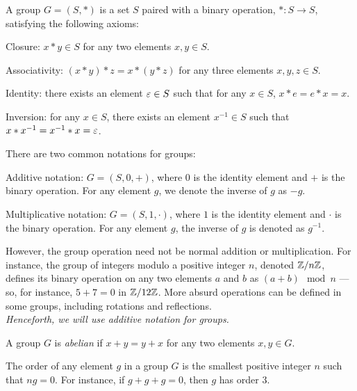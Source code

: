 \begin{definition}
  A group $G = (S, \ast)$ is a set $S$ paired with a binary operation,
  $\ast : S \to S$, satisfying the following axioms:
  \begin{enumroman}
    \item Closure: $x \ast y \in S$ for any two elements $x, y \in S$.
    \item Associativity: $(x \ast y) \ast z = x \ast (y \ast z)$
      for any three elements $x, y, z \in S$.
    \item Identity: there exists an element $\varepsilon \in S$ such that
      for any $x \in S$, $x \ast e = e \ast x = x$.
    \item Inversion: for any $x \in S$, there exists an element
      $x^{-1} \in S$ such that $x \ast x^{-1} = x^{-1} \ast x = \varepsilon$.
  \end{enumroman}
  There are two common notations for groups:
  \begin{enumroman}
    \item Additive notation: $G = (S, 0, +)$, where $0$ is the identity
      element and $+$ is the binary operation.
      For any element $g$, we denote the inverse of $g$ as $-g$.
    \item Multiplicative notation: $G = (S, 1, \cdot)$, where $1$ is the
      identity element and $\cdot$ is the binary operation.
      For any element $g$, the inverse of $g$ is denoted as $g^{-1}$.
  \end{enumroman}

  However, the group operation need not be normal addition or multiplication.
  For instance, the group of integers modulo a positive integer $n$,
  denoted $\mathbb{Z}/n\mathbb{Z}$, defines its binary operation on any two elements $a$ and $b$
  as $(a + b) \mod n$ --- so, for instance, $5 + 7 = 0$ in $\mathbb{Z}/12\mathbb{Z}$.
  More absurd operations can be defined in some groups, including
  rotations and reflections.\\
  \emph{Henceforth, we will use additive notation for groups.}
\end{definition}

\begin{definition}
  A group $G$ is \emph{abelian} if $x + y = y + x$ for any two
  elements $x, y \in G$.
\end{definition}

\begin{definition}
  The order of any element $g$ in a group $G$ is the smallest positive
  integer $n$ such that $n g = 0$.
  For instance, if $g + g + g = 0$, then $g$ has order $3$.
\end{definition}


